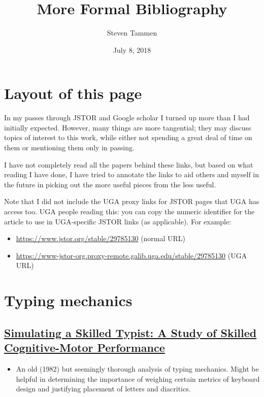\documentclass[11pt]{article}
\author{Steven Tammen}
\date{July 8, 2018}
\title{More Formal Bibliography}
\begin{document}
\maketitle
\setcounter{tocdepth}{2}
\tableofcontents


\section{Layout of this page}
\label{sec:orgec8bbd9}

In my passes through JSTOR and Google scholar I turned up more than I had initially expected. However, many things are more tangential; they may discuss topics of interest to this work, while either not spending a great deal of time on them or mentioning them only in passing.

I have not completely read all the papers behind these links, but based on what reading I have done, I have tried to annotate the links to aid others and myself in the future in picking out the more useful pieces from the less useful.

Note that I did not include the UGA proxy links for JSTOR pages that UGA has access too. UGA people reading this: you can copy the numeric identifier for the article to use in UGA-specific JSTOR links (as applicable). For example:

\begin{itemize}
\item \url{https://www.jstor.org/stable/29785130} (normal URL)
\item \url{https://www-jstor-org.proxy-remote.galib.uga.edu/stable/29785130} (UGA URL)
\end{itemize}

\section{Typing mechanics}
\label{sec:org1c492f5}

\subsection{\href{https://onlinelibrary.wiley.com/doi/pdf/10.1207/s15516709cog0601\_1}{Simulating a Skilled Typist: A Study of Skilled Cognitive-Motor Performance}}
\label{sec:org4a115ce}

\begin{itemize}
\item An old (1982) but seemingly thorough analysis of typing mechanics. Might be helpful in determining the importance of weighing certain metrics of keyboard design and justifying placement of letters and diacritics.
\end{itemize}
\end{document}
